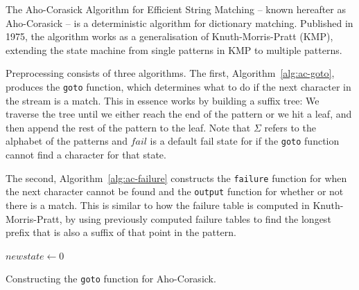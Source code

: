 \documentclass[ %
                    author={Dominic Joseph Moylett},
                    degree={MEng},
                     title={Dictionary Matching with Fingerprints},
                  subtitle={An Empirical Analysis},
                      type={research},
                      year={2015} ]{dissertation}
\begin{document}
The Aho-Corasick Algorithm for Efficient String Matching\cite{Aho:1975:ESM:360825.360855}  --  known hereafter as Aho-Corasick  --  is a deterministic algorithm for dictionary matching. Published in 1975, the algorithm works as a generalisation of Knuth-Morris-Pratt (KMP)\cite{kmp}, extending the state machine from single patterns in KMP to multiple patterns.

Preprocessing consists of three algorithms. The first, Algorithm~\ref{alg:ac-goto}, produces the \texttt{goto} function, which determines what to do if the next character in the stream is a match. This in essence works by building a suffix tree: We traverse the tree until we either reach the end of the pattern or we hit a leaf, and then append the rest of the pattern to the leaf. Note that $\Sigma$ refers to the alphabet of the patterns and $fail$ is a default fail state for if the \texttt{goto} function cannot find a character for that state.

The second, Algorithm~\ref{alg:ac-failure} constructs the \texttt{failure} function for when the next character cannot be found and the \texttt{output} function for whether or not there is a match. This is similar to how the failure table is computed in Knuth-Morris-Pratt, by using previously computed failure tables to find the longest prefix that is also a suffix of that point in the pattern.

\begin{algorithm}[t]
$newstate \gets 0$\\
\caption{Constructing the \texttt{goto} function for Aho-Corasick.}
\label{alg:ac-goto}
\end{algorithm}
\end{document}

